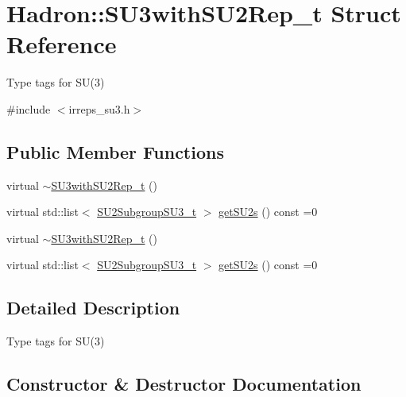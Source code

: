 \hypertarget{structHadron_1_1SU3withSU2Rep__t}{}\section{Hadron\+:\+:S\+U3with\+S\+U2\+Rep\+\_\+t Struct Reference}
\label{structHadron_1_1SU3withSU2Rep__t}


Type tags for S\+U(3)  




{\ttfamily \#include $<$irreps\+\_\+su3.\+h$>$}

\subsection*{Public Member Functions}
\begin{DoxyCompactItemize}
\item 
virtual \mbox{\hyperlink{structHadron_1_1SU3withSU2Rep__t_a17a2aadc694cdd6b0c65b63704b89d4b}{$\sim$\+S\+U3with\+S\+U2\+Rep\+\_\+t}} ()
\item 
virtual std\+::list$<$ \mbox{\hyperlink{structHadron_1_1SU2SubgroupSU3__t}{S\+U2\+Subgroup\+S\+U3\+\_\+t}} $>$ \mbox{\hyperlink{structHadron_1_1SU3withSU2Rep__t_a6bebd41fd203e3340441c04ccc220899}{get\+S\+U2s}} () const =0
\item 
virtual \mbox{\hyperlink{structHadron_1_1SU3withSU2Rep__t_a17a2aadc694cdd6b0c65b63704b89d4b}{$\sim$\+S\+U3with\+S\+U2\+Rep\+\_\+t}} ()
\item 
virtual std\+::list$<$ \mbox{\hyperlink{structHadron_1_1SU2SubgroupSU3__t}{S\+U2\+Subgroup\+S\+U3\+\_\+t}} $>$ \mbox{\hyperlink{structHadron_1_1SU3withSU2Rep__t_a6bebd41fd203e3340441c04ccc220899}{get\+S\+U2s}} () const =0
\end{DoxyCompactItemize}


\subsection{Detailed Description}
Type tags for S\+U(3) 

\subsection{Constructor \& Destructor Documentation}
\mbox{\label{structHadron_1_1SU3withSU2Rep__t_a17a2aadc694cdd6b0c65b63704b89d4b}} 
